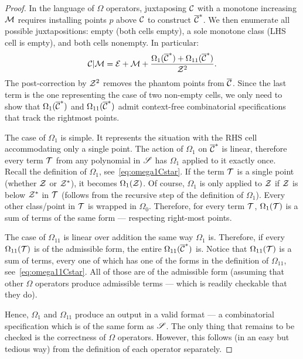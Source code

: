 \documentclass[12pt, a4paper, twoside]{report}
\begin{document}
\begin{proof}
In the language of $\Omega$ operators, juxtaposing $\mathcal{C}$ with a monotone increasing $\mathcal{M}$ requires installing points $p$ above $\mathcal{C}$ to construct $\overline{\mathcal{C}}^*$. We then enumerate all possible juxtapositions: empty (both cells empty), a sole monotone class (LHS cell is empty), and both cells nonempty. In particular:
$$\mathcal{C}|\mathcal{M} = \mathcal{E} + \mathcal{M} + \frac{\Omega_1(\overline{\mathcal{C}}^*) + \Omega_{11}(\overline{\mathcal{C}}^*)}{\mathcal{Z}^2}.$$
The post-correction by $\mathcal{Z}^2$ removes the phantom points from $\overline{\mathcal{C}}$. Since the last term is the one representing the case of two non-empty cells, we only need to show that $\Omega_1(\overline{\mathcal{C}}^*)$ and $\Omega_{11}(\overline{\mathcal{C}}^*)$ admit context-free combinatorial specifications that track the rightmost points.

The case of $\Omega_1$ is simple. It represents the situation with the RHS cell accommodating only a single point. The action of $\Omega_1$ on $\overline{\mathcal{C}}^*$ is linear, therefore every term $\mathcal{T}$ from any polynomial in $\mathscr{S}$ has $\Omega_1$ applied to it exactly once. Recall the definition of $\Omega_1$, see~\eqref{eq:omega1Cstar}. If the term $\mathcal{T}$ is a single point (whether $\mathcal{Z}$ or $\mathcal{Z}^*$), it becomes $\Omega_1(\mathcal{Z})$. Of course, $\Omega_1$ is only applied to $\mathcal{Z}$ if $\mathcal{Z}$ is below $\mathcal{Z}^*$ in $\mathcal{T}$ (follows from the recursive step of the definition of $\Omega_1$). Every other class/point in $\mathcal{T}$ is wrapped in $\Omega_0$. Therefore, for every term $\mathcal{T}$, $\Omega_1(\mathcal{T})$ is a sum of terms of the same form --- respecting right-most points.

The case of $\Omega_{11}$ is linear over addition the same way $\Omega_1$ is. Therefore, if every $\Omega_{11}(\mathcal{T})$ is of the admissible form, the entire $\Omega_{11}(\overline{\mathcal{C}}^*)$ is. Notice that $\Omega_{11}(\mathcal{T})$ is a sum of terms, every one of which has one of the forms in the definition of $\Omega_{11}$, see~\eqref{eq:omega11Cstar}. All of those are of the admissible form (assuming that other $\Omega$ operators produce admissible terms --- which is readily checkable that they do).

Hence, $\Omega_1$ and $\Omega_{11}$ produce an output in a valid format --- a combinatorial specification which is of the same form as $\mathscr{S}$. The only thing that remains to be checked is the correctness of $\Omega$ operators. However, this follows (in an easy but tedious way) from the definition of each operator separately.
\end{proof}
\end{document}
